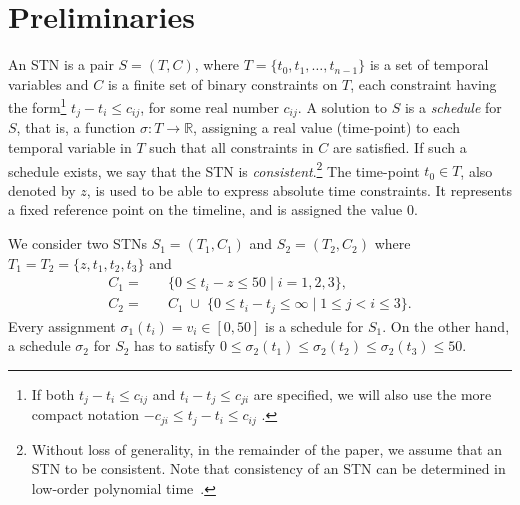 \section{Preliminaries}
An STN  is a pair $S = (T,C)$, where $T = \{t_{0},t_{1}, \ldots, t_{n-1}\}$ is a set of temporal variables and $C$ is a finite set of binary constraints on $T$, each constraint having the form\footnote{If both $t_{j}-t_{i}\leq c_{ij}$ and $t_{i}-t_{j}\leq c_{ji}$ are specified, we will also use the more compact notation $- c_{ji}\leq t_j - t_i \leq c_{ij}$ 
.} 
$t_{j}-t_{i}\leq c_{ij}$, for some real number $c_{ij}$. 
A solution to $S$ is a \emph{schedule} for $S$, that is, a function $\sigma: T \rightarrow \mathbb{R}$, assigning a real value (time-point) to each temporal variable in $T$ such that all constraints in $C$ are satisfied. If such a schedule exists, we say that the STN is \emph{consistent}.\footnote{Without loss of generality, in the remainder of the paper, we assume that an STN to be consistent. Note that consistency of an STN can be determined in low-order polynomial time~\cite{dechter1991}.}
The time-point $t_{0} \in T$, also denoted by $z$, is used to be able to express absolute time constraints. It represents a fixed reference point on the timeline, and is assigned the value $0$. 
\begin{example} \label{ex.1}
We consider two STNs $S_1 = (T_1, C_1)$ and $S_2 = (T_2, C_2)$ where $T_1 = T_2 =  \{z, t_1, t_2, t_3\}$ and
\begin{align*}
C_1 = \quad&\{ 0 \leq t_i - z \leq 50 \mid i=1,2,3 \}, \\
C_2 = \quad&C_1 \; \cup 
 \; \{ 0 \leq t_i - t_j \leq \infty \mid 1 \leq j < i \leq 3 \}.
\end{align*}
 Every assignment $\sigma_1(t_i) = v_i\in [0,50]$ is a schedule for $S_1$.  On the other hand, a schedule $\sigma_2$ for $S_2$ has to satisfy $0 \leq \sigma_2(t_1) \leq \sigma_2(t_2) \leq \sigma_2(t_3) \leq 50$. 
\end{example}
